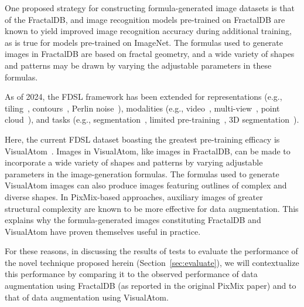 One proposed strategy for constructing
formula-generated image datasets is that
of the FractalDB, and image recognition
models pre-trained on FractalDB are known to yield improved
image recognition accuracy during additional training,
as is true for models pre-trained on ImageNet.
The formulas used to generate images in FractalDB
are based on fractal geometry, and
a wide variety of shapes and patterns may be drawn
by varying the adjustable parameters in these formulas.

As of 2024, the FDSL framework has been extended for representations (e.g., tiling~\cite{TileDB}, contours~\cite{RCDB}, Perlin noise~\cite{PerlinNoiseDB}), modalities (e.g., video~\cite{VideoPerlin}, multi-view~\cite{MV-FractalDB}, point cloud~\cite{PC-FractalDB}), and tasks (e.g., segmentation~\cite{SegRCDB}, limited pre-training~\cite{OFDB,1p-frac}, 3D segmentation~\cite{PrimGeoSeg}). 

Here, the current FDSL dataset boasting the
greatest pre-training efficacy is VisualAtom~\cite{VisualAtom}.
Images in VisualAtom, like images in FractalDB,
can be made to incorporate a wide variety
of shapes and patterns by varying adjustable parameters
in the image-generation formulas.
The formulas used to generate VisualAtom images
can also produce images featuring outlines of
complex and diverse shapes.
In PixMix-based approaches,
auxiliary images of greater structural complexity
are known to be more effective for data augmentation.
This explains why the formula-generated images
constituting FractalDB and VisualAtom have proven themselves useful in practice.

For these reasons, in discussing the results of tests to
evaluate the performance of the novel technique proposed
herein (Section~\ref{sec:evaluate}),  we will
contextualize this performance by comparing it
to the observed performance of data augmentation
using FractalDB (as reported in the original PixMix paper)
and to that of data augmentation using VisualAtom.